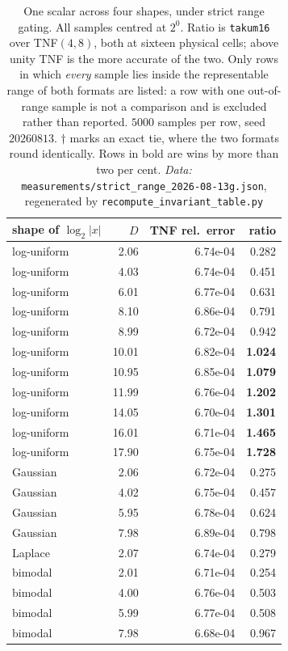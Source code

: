 \documentclass[11pt]{article}
\theoremstyle{definition}
\begin{document}
\begin{table}[htbp]\centering
\caption{One scalar across four shapes, under strict range gating. All samples
centred at $2^0$. Ratio is \texttt{takum16} over TNF$(4,8)$, both at sixteen
physical cells; above unity TNF is the more accurate of the two. Only rows in
which \emph{every} sample lies inside the representable range of both formats are
listed: a row with one out-of-range sample is not a comparison and is excluded
rather than reported. $5000$ samples per row, seed $20260813$. $\dagger$ marks an
exact tie, where the two formats round identically. Rows in bold are wins by more
than two per cent. \emph{Data:} \texttt{measurements/strict\_range\_2026-08-13g.json}, regenerated by \texttt{recompute\_invariant\_table.py}}
\label{tab:invariant}
\begin{tabular}{lrrr}
\hline
shape of $\log_2|x|$ & $D$ & TNF rel.\ error & ratio \\
\hline
log-uniform & 2.06 & 6.74e-04 & 0.282 \\
log-uniform & 4.03 & 6.74e-04 & 0.451 \\
log-uniform & 6.01 & 6.77e-04 & 0.631 \\
log-uniform & 8.10 & 6.86e-04 & 0.791 \\
log-uniform & 8.99 & 6.72e-04 & 0.942 \\
log-uniform & 10.01 & 6.82e-04 & \textbf{1.024} \\
log-uniform & 10.95 & 6.85e-04 & \textbf{1.079} \\
log-uniform & 11.99 & 6.76e-04 & \textbf{1.202} \\
log-uniform & 14.05 & 6.70e-04 & \textbf{1.301} \\
log-uniform & 16.01 & 6.71e-04 & \textbf{1.465} \\
log-uniform & 17.90 & 6.75e-04 & \textbf{1.728} \\
\hline
Gaussian & 2.06 & 6.72e-04 & 0.275 \\
Gaussian & 4.02 & 6.75e-04 & 0.457 \\
Gaussian & 5.95 & 6.78e-04 & 0.624 \\
Gaussian & 7.98 & 6.89e-04 & 0.798 \\
\hline
Laplace & 2.07 & 6.74e-04 & 0.279 \\
\hline
bimodal & 2.01 & 6.71e-04 & 0.254 \\
bimodal & 4.00 & 6.76e-04 & 0.503 \\
bimodal & 5.99 & 6.77e-04 & 0.508 \\
bimodal & 7.98 & 6.68e-04 & 0.967 \\

\end{tabular}
\end{table}
\end{document}

